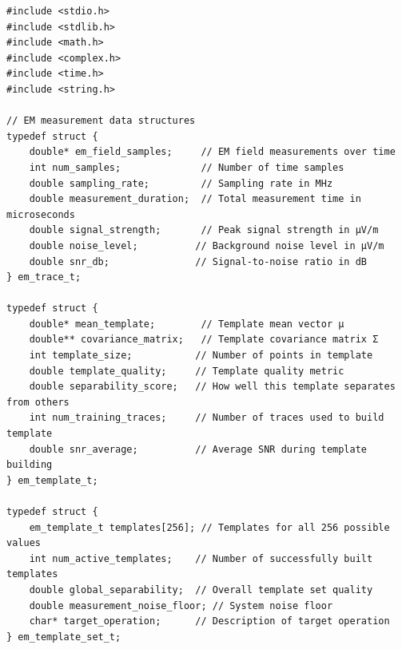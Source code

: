 \documentclass[11pt,a4paper]{article}
\theoremstyle{definition}
\begin{document}
\begin{lstlisting}[caption={Complete EM Template Building Implementation}]
#include <stdio.h>
#include <stdlib.h>
#include <math.h>
#include <complex.h>
#include <time.h>
#include <string.h>

// EM measurement data structures
typedef struct {
    double* em_field_samples;     // EM field measurements over time
    int num_samples;              // Number of time samples
    double sampling_rate;         // Sampling rate in MHz
    double measurement_duration;  // Total measurement time in microseconds
    double signal_strength;       // Peak signal strength in μV/m
    double noise_level;          // Background noise level in μV/m
    double snr_db;               // Signal-to-noise ratio in dB
} em_trace_t;

typedef struct {
    double* mean_template;        // Template mean vector μ
    double** covariance_matrix;   // Template covariance matrix Σ
    int template_size;           // Number of points in template
    double template_quality;     // Template quality metric
    double separability_score;   // How well this template separates from others
    int num_training_traces;     // Number of traces used to build template
    double snr_average;          // Average SNR during template building
} em_template_t;

typedef struct {
    em_template_t templates[256]; // Templates for all 256 possible values
    int num_active_templates;    // Number of successfully built templates
    double global_separability;  // Overall template set quality
    double measurement_noise_floor; // System noise floor
    char* target_operation;      // Description of target operation
} em_template_set_t;


\end{lstlisting}
\end{document}
